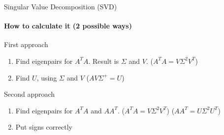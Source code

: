 \documentclass[aspectratio=169]{beamer}
\begin{document}
\begin{frame}[t]{Singular Value Decomposition (SVD)}
\framesubtitle{How to calculate it (2 possible ways)}
    \begin{block}{First approach}
        \begin{enumerate}
            \item Find eigenpairs for $A^TA$. Result is $\Sigma$ and $V$. ($A^TA=V\Sigma^{2}V^T$)
            \item Find $U$, using $\Sigma$ and $V$ ($AV\Sigma^+ = U$)
        \end{enumerate}
    \end{block}
    \begin{block}{Second approach}
        \begin{enumerate}
            \item Find eigenpairs for $A^TA$ and $AA^T$. ($A^TA=V\Sigma^{2}V^T$) ($AA^T=U\Sigma^{2}U^T$)
            \item Put signs correctly
        \end{enumerate}
    \end{block}
\end{frame}
\end{document}
